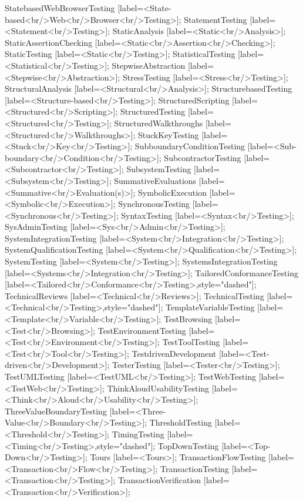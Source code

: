 \documentclass{article}
\begin{document}
{StatebasedWebBrowserTesting [label=<State-based<br/>Web<br/>Browser<br/>Testing>];
StatementTesting [label=<Statement<br/>Testing>];
StaticAnalysis [label=<Static<br/>Analysis>];
StaticAssertionChecking [label=<Static<br/>Assertion<br/>Checking>];
StaticTesting [label=<Static<br/>Testing>];
StatisticalTesting [label=<Statistical<br/>Testing>];
StepwiseAbstraction [label=<Stepwise<br/>Abstraction>];
StressTesting [label=<Stress<br/>Testing>];
StructuralAnalysis [label=<Structural<br/>Analysis>];
StructurebasedTesting [label=<Structure-based<br/>Testing>];
StructuredScripting [label=<Structured<br/>Scripting>];
StructuredTesting [label=<Structured<br/>Testing>];
StructuredWalkthroughs [label=<Structured<br/>Walkthroughs>];
StuckKeyTesting [label=<Stuck<br/>Key<br/>Testing>];
SubboundaryConditionTesting [label=<Sub-boundary<br/>Condition<br/>Testing>];
SubcontractorTesting [label=<Subcontractor<br/>Testing>];
SubsystemTesting [label=<Subsystem<br/>Testing>];
SummativeEvaluations [label=<Summative<br/>Evaluation(s)>];
SymbolicExecution [label=<Symbolic<br/>Execution>];
SynchronousTesting [label=<Synchronous<br/>Testing>];
SyntaxTesting [label=<Syntax<br/>Testing>];
SysAdminTesting [label=<Sys<br/>Admin<br/>Testing>];
SystemIntegrationTesting [label=<System<br/>Integration<br/>Testing>];
SystemQualificationTesting [label=<System<br/>Qualification<br/>Testing>];
SystemTesting [label=<System<br/>Testing>];
SystemsIntegrationTesting [label=<Systems<br/>Integration<br/>Testing>];
TailoredConformanceTesting [label=<Tailored<br/>Conformance<br/>Testing>,style="dashed"];
TechnicalReviews [label=<Technical<br/>Reviews>];
TechnicalTesting [label=<Technical<br/>Testing>,style="dashed"];
TemplateVariableTesting [label=<Template<br/>Variable<br/>Testing>];
TestBrowsing [label=<Test<br/>Browsing>];
TestEnvironmentTesting [label=<Test<br/>Environment<br/>Testing>];
TestToolTesting [label=<Test<br/>Tool<br/>Testing>];
TestdrivenDevelopment [label=<Test-driven<br/>Development>];
TesterTesting [label=<Tester<br/>Testing>];
TestUMLTesting [label=<TestUML<br/>Testing>];
TestWebTesting [label=<TestWeb<br/>Testing>];
ThinkAloudUsabilityTesting [label=<Think<br/>Aloud<br/>Usability<br/>Testing>];
ThreeValueBoundaryTesting [label=<Three-Value<br/>Boundary<br/>Testing>];
ThresholdTesting [label=<Threshold<br/>Testing>];
TimingTesting [label=<Timing<br/>Testing>,style="dashed"];
TopDownTesting [label=<Top-Down<br/>Testing>];
Tours [label=<Tours>];
TransactionFlowTesting [label=<Transaction<br/>Flow<br/>Testing>];
TransactionTesting [label=<Transaction<br/>Testing>];
TransactionVerification [label=<Transaction<br/>Verification>];
}
\end{document}
